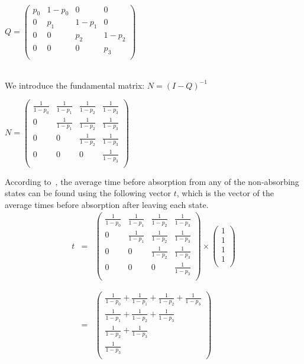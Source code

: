 \documentclass[journal]{IEEEtran}
\begin{document}
\\
\begin{center}
$Q=\left(
  \begin{array}{cccc}
    p_0 & 1-p_0 & 0 & 0 \\
    0 & p_1 & 1-p_1 & 0 \\
    0 & 0 & p_2 & 1-p_2 \\
    0 & 0 & 0 & p_3 \\
  \end{array}
\right)$
\end{center}\
\\
We introduce the fundamental matrix: $N=(I-Q)^{-1}$~\cite{MC}
\\
\begin{center}
$N=\left(
  \begin{array}{cccc}
    \frac{1}{1-p_0} & \frac{1}{1-p_1} & \frac{1}{1-p_2} & \frac{1}{1-p_3} \\
    0 & \frac{1}{1-p_1} & \frac{1}{1-p_2} & \frac{1}{1-p_3} \\
    0 & 0 & \frac{1}{1-p_2} & \frac{1}{1-p_3} \\
    0 & 0 & 0 & \frac{1}{1-p_3} \\
  \end{array}
\right)$
\end{center}
 According to~\cite{MC}, the average time before absorption from any of the non-absorbing states can be found using the following vector $t$, which is the vector of the average times before absorption after leaving each state.\\
 \begin{eqnarray}
 t &=& \left(
  \begin{array}{cccc}
    \frac{1}{1-p_0} & \frac{1}{1-p_1} & \frac{1}{1-p_2} & \frac{1}{1-p_3} \\
    0 & \frac{1}{1-p_1} & \frac{1}{1-p_2} & \frac{1}{1-p_3} \\
    0 & 0 & \frac{1}{1-p_2} & \frac{1}{1-p_3} \\
    0 & 0 & 0 & \frac{1}{1-p_3} \\
  \end{array}
  \right)
    \times
 \left(
     \begin{array}{c}
       1 \\
       1 \\
       1 \\
       1 \\
     \end{array}
 \right)\nonumber\\
 \nonumber\\
  \nonumber\\
&=& \left(
     \begin{array}{c}
       \frac{1}{1-p_0}+\frac{1}{1-p_1}+\frac{1}{1-p_2}+\frac{1}{1-p_3} \\
       \frac{1}{1-p_1}+\frac{1}{1-p_2}+\frac{1}{1-p_3} \\
       \frac{1}{1-p_2}+\frac{1}{1-p_3} \\
       \frac{1}{1-p_3} \\
     \end{array}
 \right)\nonumber\\
\end{eqnarray}
\end{document}
